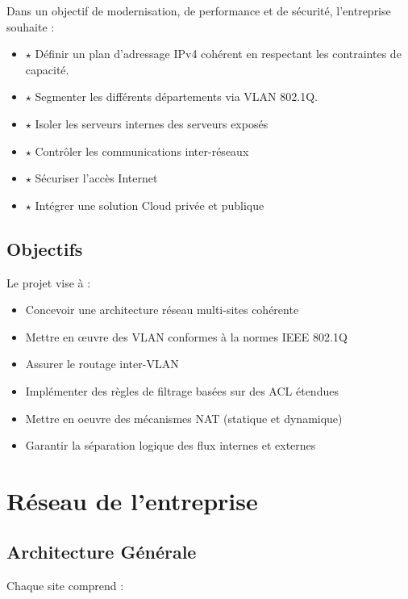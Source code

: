 \documentclass[11pt,a4paper]{memoir}%
\begin{document}
	Dans un objectif de modernisation, de performance et de sécurité, l'entreprise souhaite :
	\begin{itemize}
		\item{$\star$} Définir un plan d’adressage IPv4 cohérent en respectant les contraintes de capacité.  
		\item{$\star$} Segmenter les différents départements via VLAN 802.1Q.   
		\item{$\star$} Isoler les serveurs internes des serveurs exposés  
		\item{$\star$} Contrôler les communications inter-réseaux
		\item{$\star$} Sécuriser l'accès Internet
		\item{$\star$} Intégrer une solution Cloud privée et publique 
	\end{itemize}
	
	\section{Objectifs}
	Le projet vise à :
	\begin{itemize}
		\item[$\rightarrow$] Concevoir une architecture réseau multi-sites cohérente
		\item[$\rightarrow$] Mettre en œuvre des VLAN conformes à la normes IEEE 802.1Q
		\item[$\rightarrow$] Assurer le routage inter-VLAN
		\item[$\rightarrow$] Implémenter des règles de filtrage basées sur des ACL étendues
		\item[$\rightarrow$] Mettre en oeuvre des mécanismes NAT (statique et dynamique)
		\item[$\rightarrow$] Garantir la séparation logique des flux internes et externes
	\end{itemize}

\chapter{Réseau de l'entreprise}
	\section{Architecture Générale}

		Chaque site comprend :
		
\end{document}
